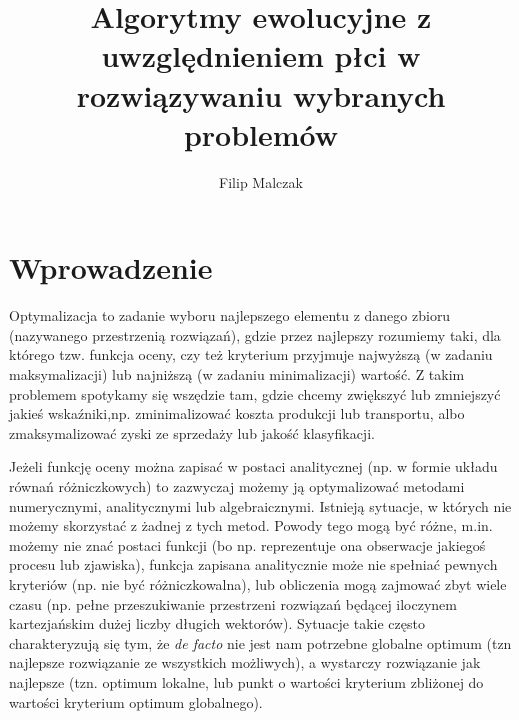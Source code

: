 \documentclass[twoside]{iisthesis}
\newcommand{\defacto}{\emph{de facto }}
\begin{document}
\title{Algorytmy ewolucyjne z uwzględnieniem płci w rozwiązywaniu wybranych problemów}
\author{Filip Malczak}

\date{\number\the\year}

	


\maketitle
\textpages

\chapter{Wprowadzenie}

Optymalizacja to zadanie wyboru najlepszego elementu z danego zbioru (nazywanego przestrzenią rozwiązań), gdzie przez najlepszy rozumiemy taki, dla którego tzw. funkcja oceny, czy też kryterium przyjmuje najwyższą (w zadaniu maksymalizacji) lub najniższą (w zadaniu minimalizacji) wartość. Z takim problemem spotykamy się wszędzie tam, gdzie chcemy zwiększyć lub zmniejszyć jakieś wskaźniki,np. zminimalizować koszta produkcji lub transportu, albo zmaksymalizować zyski ze sprzedaży lub jakość klasyfikacji.

Jeżeli funkcję oceny można zapisać w postaci analitycznej (np. w formie układu równań różniczkowych) to zazwyczaj możemy ją optymalizować metodami numerycznymi, analitycznymi lub algebraicznymi. Istnieją sytuacje, w których nie możemy skorzystać z żadnej z tych metod. Powody tego mogą być różne, m.in. możemy nie znać postaci funkcji (bo np. reprezentuje ona obserwacje jakiegoś procesu lub zjawiska), funkcja zapisana analitycznie może nie spełniać pewnych kryteriów (np. nie być różniczkowalna), lub obliczenia mogą zajmować zbyt wiele czasu (np. pełne przeszukiwanie przestrzeni rozwiązań będącej iloczynem kartezjańskim dużej liczby długich wektorów). Sytuacje takie często charakteryzują się tym, że \defacto nie jest nam potrzebne globalne optimum (tzn najlepsze rozwiązanie ze wszystkich możliwych), a wystarczy rozwiązanie jak najlepsze (tzn. optimum lokalne, lub punkt o wartości kryterium zbliżonej do wartości kryterium optimum globalnego).
\end{document}
